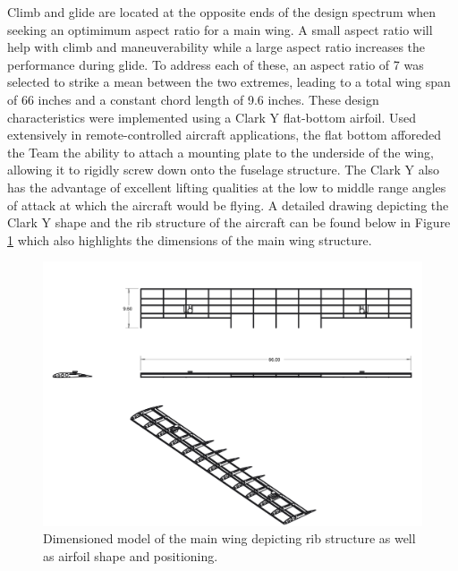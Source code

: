 \documentclass[titlepage]{article}
\begin{document}
Climb and glide are located at the opposite ends of the design spectrum when seeking an optimimum aspect ratio for a main wing. A small aspect ratio will help with climb and maneuverability while a large aspect ratio increases the performance during glide. To address each of these, an aspect ratio of 7 was selected to strike a mean between the two extremes, leading to a total wing span of 66 inches and a constant chord length of 9.6 inches. These design characteristics were implemented using a Clark Y flat-bottom airfoil. Used extensively in remote-controlled aircraft applications, the flat bottom afforeded the Team the ability to attach a mounting plate to the underside of the wing, allowing it to rigidly screw down onto the fuselage structure. The Clark Y also has the advantage of excellent lifting qualities at the low to middle range angles of attack at which the aircraft would be flying. A detailed drawing depicting the Clark Y shape and the rib structure of the aircraft can be found below in Figure \ref{wing} which also highlights the dimensions of the main wing structure.

\begin{figure}[h]
 \includegraphics[width=1\columnwidth]{Wing_Design.png}
 \caption{Dimensioned model of the main wing depicting rib structure as well as airfoil shape and positioning.}
\label{wing}
\end{figure}
\end{document}

